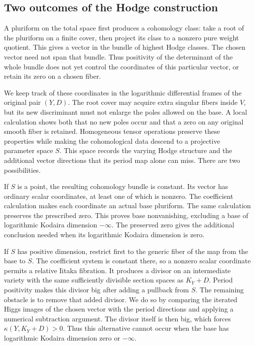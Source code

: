 \subsection{Two outcomes of the Hodge construction}

A pluriform on the total space first produces a cohomology class:
take a root of the pluriform on a finite cover, then project its class
to a nonzero pure weight quotient. This gives a vector in the bundle
of highest Hodge classes. The chosen vector need not span that bundle.
Thus positivity of the determinant of the whole bundle does not yet
control the coordinates of this particular vector, or retain its zero
on a chosen fiber.

We keep track of these coordinates in the logarithmic differential
frames of the original pair $(Y,D)$. The root cover may acquire extra
singular fibers inside $V$, but its new discriminant must not enlarge
the poles allowed on the base. A local calculation shows both that
no new poles occur and that a zero on any original smooth fiber is
retained. Homogeneous tensor operations preserve these properties
while making the cohomological data descend to a projective parameter
space $S$. This space records the varying Hodge structure and the
additional vector directions that its period map alone can miss.
There are two possibilities.

If $S$ is a point, the resulting cohomology bundle is constant.
Its vector has ordinary scalar coordinates, at least one of which
is nonzero. The coefficient calculation makes each coordinate an
actual base pluriform. The same calculation preserves the prescribed
zero. This proves base nonvanishing, excluding a base of logarithmic Kodaira
dimension $-\infty$. The preserved zero gives the additional conclusion
needed when its logarithmic Kodaira dimension is zero.

If $S$ has positive dimension, restrict first to the generic fiber
of the map from the base to $S$. The coefficient system is constant
there, so a nonzero scalar coordinate permits a relative Iitaka
fibration. It produces a divisor on an intermediate variety with the
same sufficiently divisible section spaces as $K_Y+D$. Period
positivity makes this divisor big after adding a pullback from $S$.
The remaining obstacle is to remove that added divisor. We do so by
comparing the iterated Higgs images of the chosen vector with the
period directions and applying a numerical subtraction argument.
The divisor itself is then big, which forces
$\kappa(Y,K_Y+D)>0$. Thus this alternative cannot occur when the
base has logarithmic Kodaira dimension zero or $-\infty$.

